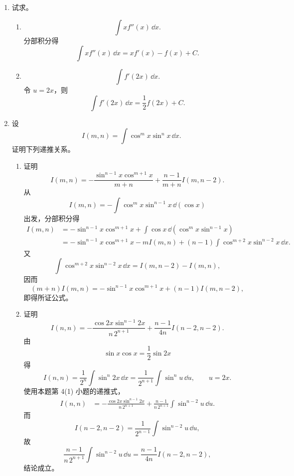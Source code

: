\begin{enumerate}
\begin{enumerate}[label=(\arabic*)]
    \item 令
    \[
      J_n=\int\frac{\dd x}{x^n\sqrt{1+x^2}}.
    \]
    计算
    \begin{align*}
      \frac{\dd}{\dd x}\left(\frac{\sqrt{1+x^2}}{x^{n-1}}\right)
      &=(2-n)\frac1{x^{n-2}\sqrt{1+x^2}}
       +(1-n)\frac1{x^n\sqrt{1+x^2}}.
    \end{align*}
    对 $n>1$ 积分整理得
    \[
      \boxed{J_n
      =-\frac{\sqrt{1+x^2}}{(n-1)x^{n-1}}
       -\frac{n-2}{n-1}J_{n-2}}.
    \]
    可用
    \[
      J_0=\ln(x+\sqrt{1+x^2})+C,
      \qquad
      J_1=\ln\abs{\frac{x}{1+\sqrt{1+x^2}}}+C
    \]
    作为初始积分。
  \end{enumerate}

  \item 试求。
  \begin{enumerate}[label=(\arabic*)]
    \item
    \[
      \int x f''(x)\,\dd x.
    \]
    分部积分得
    \[
      \boxed{\int x f''(x)\,\dd x=x f'(x)-f(x)+C}.
    \]

    \item
    \[
      \int f'(2x)\,\dd x.
    \]
    令 $u=2x$，则
    \[
      \boxed{\int f'(2x)\,\dd x=\frac12f(2x)+C}.
    \]
  \end{enumerate}

  \item 设
  \[
    I(m,n)=\int\cos^mx\sin^nx\,\dd x.
  \]
  证明下列递推关系。
  \begin{enumerate}[label=(\arabic*)]
    \item 证明
    \[
      I(m,n)=-\frac{\sin^{n-1}x\cos^{m+1}x}{m+n}
      +\frac{n-1}{m+n}I(m,n-2).
    \]
    从
    \[
      I(m,n)=-\int\cos^mx\sin^{n-1}x\,\dd(\cos x)
    \]
    出发，分部积分得
    \begin{align*}
      I(m,n)
      &=-\sin^{n-1}x\cos^{m+1}x
       +\int\cos x\,\dd(\cos^mx\sin^{n-1}x)\\
      &=-\sin^{n-1}x\cos^{m+1}x
       -mI(m,n)
       +(n-1)\int\cos^{m+2}x\sin^{n-2}x\,\dd x.
    \end{align*}
    又
    \[
      \int\cos^{m+2}x\sin^{n-2}x\,\dd x
      =I(m,n-2)-I(m,n),
    \]
    因而
    \[
      (m+n)I(m,n)
      =-\sin^{n-1}x\cos^{m+1}x+(n-1)I(m,n-2),
    \]
    即得所证公式。

    \item 证明
    \[
      I(n,n)=-\frac{\cos2x\sin^{n-1}2x}{n\,2^{n+1}}
      +\frac{n-1}{4n}I(n-2,n-2).
    \]
    由
    \[
      \sin x\cos x=\frac12\sin2x
    \]
    得
    \[
      I(n,n)=\frac1{2^n}\int\sin^n2x\,\dd x
      =\frac1{2^{n+1}}\int\sin^nu\,\dd u,
      \qquad u=2x.
    \]
    使用本题第 4(1) 小题的递推式，
    \begin{align*}
      I(n,n)
      &=-\frac{\cos2x\sin^{n-1}2x}{n\,2^{n+1}}
       +\frac{n-1}{n\,2^{n+1}}\int\sin^{n-2}u\,\dd u.
    \end{align*}
    而
    \[
      I(n-2,n-2)=\frac1{2^{n-1}}\int\sin^{n-2}u\,\dd u,
    \]
    故
    \[
      \frac{n-1}{n\,2^{n+1}}\int\sin^{n-2}u\,\dd u
      =\frac{n-1}{4n}I(n-2,n-2),
    \]
    结论成立。
  \end{enumerate}
\end{enumerate}

